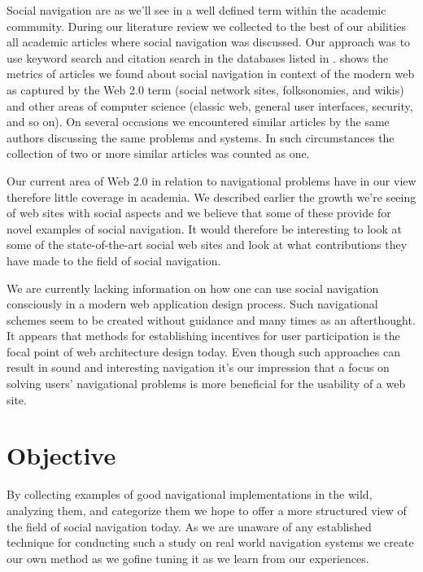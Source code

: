 Social navigation are as we'll see in
a well defined term within the academic community.
During our literature review we collected to the best of our abilities all
academic articles where social navigation was discussed. Our approach was to
use keyword search and citation search in the databases listed in
.%
 shows the metrics of articles
we found about social navigation in context of the modern web as captured by
the Web 2.0 term (social network sites, folksonomies, and wikis) and other
areas of computer science (classic web, general user interfaces, security, and
so on).
On several occasions we encountered similar articles by the same authors
discussing the same problems and systems. In such circumstances the collection
of two or more similar articles was counted as one.

Our current area of Web 2.0 in relation to navigational problems have in our
view therefore little coverage in academia.
We described earlier the growth we're seeing of web sites with social
aspects and we believe that some of these provide for novel examples of social
navigation. It would therefore be interesting to look at some of the
state-of-the-art social web sites and look at what contributions they have
made to the field of social navigation.

We are currently lacking information on how one can use social navigation
consciously in a modern web application design process. Such navigational
schemes seem to be created without guidance and many times as an afterthought.
It appears that methods for establishing incentives for user participation
is the focal point of web architecture design today. Even though such
approaches can result in sound and interesting navigation it's our impression
that a focus on solving users' navigational problems is more beneficial for
the usability of a web site.

\section{Objective}

By collecting examples of good navigational implementations in the wild,
analyzing them, and categorize them we hope to offer a more structured
view of the field of social navigation today.
As we are unaware of any established technique for
conducting such a study on real world navigation systems we create our own
method as we go\dash{}fine tuning it as we learn from our experiences.

